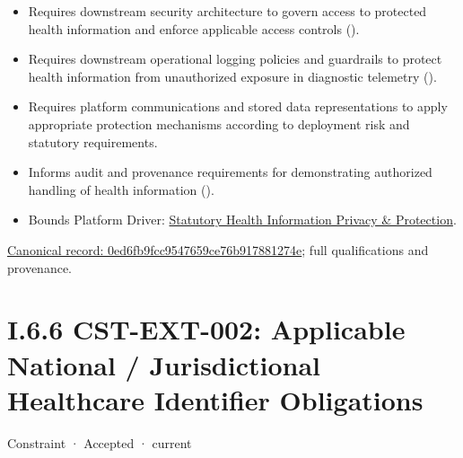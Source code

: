 \begin{itemize}


\item Requires downstream security architecture to govern access to protected health information and enforce applicable access controls (\href{\detokenize{../../../../../../../../../docs/markdown/01-motivation/requirements-constraints/master-requirements-catalogue.md}}{\texttt{}}).

\item Requires downstream operational logging policies and guardrails to protect health information from unauthorized exposure in diagnostic telemetry (\href{\detokenize{../../../../../../../../../docs/markdown/01-motivation/requirements-constraints/master-requirements-catalogue.md}}{\texttt{}}).

\item Requires platform communications and stored data representations to apply appropriate protection mechanisms according to deployment risk and statutory requirements.

\item Informs audit and provenance requirements for demonstrating authorized handling of health information (\href{\detokenize{../../../../../../../../../docs/markdown/01-motivation/requirements-constraints/master-requirements-catalogue.md}}{\texttt{}}).

\item Bounds Platform Driver: \href{\detokenize{../../../../../../../../../docs/markdown/01-motivation/drivers-assessments/drivers.md}}{Statutory Health Information Privacy \& Protection}.

\end{itemize}

{\footnotesize \href{../../../../../../../../continuum/motivation/constraint/0ed6fb9fcc9547659ce76b917881274e.md}{Canonical record: 0ed6fb9fcc9547659ce76b917881274e}; full qualifications and provenance.}\par
\section*{I.6.6 CST-EXT-002: Applicable National / Jurisdictional Healthcare Identifier Obligations}
\label{navigation:I.6.6}

\label{element:edb1db6b18d84487ab48b9416f26e980}
{\small Constraint · Accepted · current}\par

